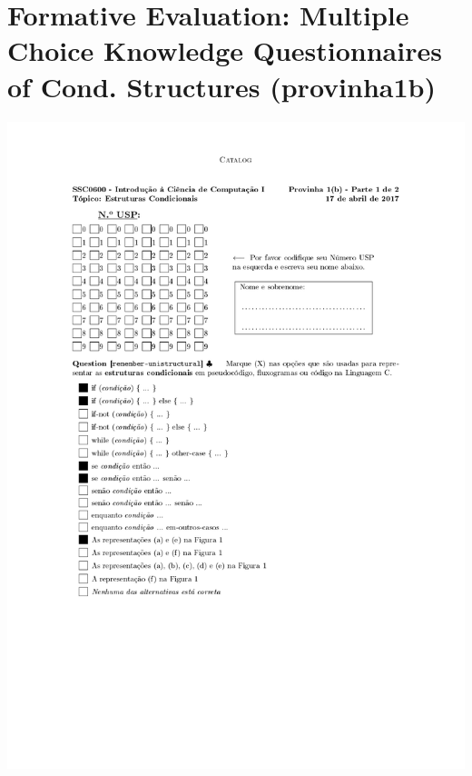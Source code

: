 \section{Formative Evaluation: Multiple Choice Knowledge Questionnaires of Cond. Structures (provinha1b)}
\label{annex:first-study-pos}
\includegraphics[page=1,width=1\textwidth]{images/annex/first-study-pos-1.pdf}
\newpage
